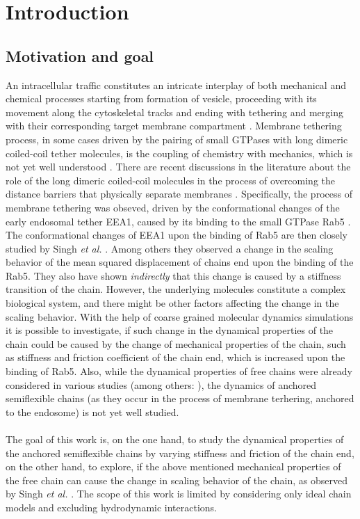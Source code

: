\documentclass[
    paper=A4,pagesize=automedia,fontsize=12pt,
    BCOR=15mm,DIV=22,
    twoside,headinclude,footinclude=false,
    fleqn,             %
    bibliography=totocnumbered,          %
    listof=totoc,                %
    listof=flat,                 %
    cleardoublepage=empty      %
    numbers=endperiod
]{scrartcl}
\begin{document}
\cleardoublepage

\thispagestyle{empty}
\tableofcontents

\cleardoublepage



\section{Introduction}
\subsection{Motivation and goal}
An intracellular traffic constitutes an intricate interplay of both mechanical 
and chemical processes starting from formation of vesicle, proceeding with 
its movement along the cytoskeletal tracks and ending with tethering and merging
with their corresponding target membrane compartment \cite{Singh:2022}.
Membrane tethering process, in some cases driven by the pairing of
small GTPases with long dimeric coiled-coil tether molecules, \cite{Singh:2022}  
is the coupling of chemistry with mechanics, which is not yet well 
understood \cite{Singh:2022}. There are recent discussions in the literature
about the role of the long dimeric coiled-coil molecules in the process
of overcoming the distance barriers that physically separate 
membranes \cite{Singh:2022}. Specifically, the process of membrane tethering was
obseved, driven by the conformational changes of the early endosomal
tether EEA1, caused by its binding to the small GTPase Rab5 \cite{Murray2016}.
The conformational changes of EEA1 upon the binding of Rab5 are then closely
studied by Singh \emph{et al.} \cite{Singh:2022}. 
Among others they observed 
a change in the scaling behavior of the mean squared displacement of 
chains end upon the binding of the Rab5. They also have shown \emph{indirectly} 
that this change is caused by a stiffness transition of the chain.
However, the underlying molecules constitute a complex biological system, and
there might be other factors affecting the change in the scaling behavior.
With the help of coarse grained molecular dynamics simulations it is possible
to investigate, if such change in the dynamical properties of the chain could 
be caused by the change of mechanical properties of the chain, such as stiffness and 
friction coefficient of the chain end, 
which is increased upon the binding of Rab5. Also, while the dynamical
properties of free chains were already considered in various studies 
(among others: \cite{Singh:2022} \cite{Nikoubashman2016} 
\cite{Kremer_ChemPhys} \cite{Hinczewski_2009}), the dynamics of anchored
semiflexible chains
(as they occur in the process of membrane terhering, anchored to the endosome)
is not yet well studied. 
\\
\\
The goal of this work is, on the one hand, to study 
the dynamical properties of the anchored semiflexible chains by varying 
stiffness and 
friction of the chain end, on the other hand, to explore, if the above mentioned
mechanical properties of the free chain can cause the change in scaling behavior
of the chain, as observed by Singh \emph{et al.} \cite{Singh:2022}. The scope
of this work is limited by considering only ideal chain models and excluding
hydrodynamic interactions.
\end{document}
